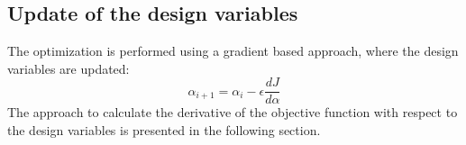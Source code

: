 \subsection{Update of the design variables}
The optimization is performed using a gradient based approach, where the design variables are updated:
\begin{equation}
\alpha_{i+1} = \alpha_i - \epsilon \frac{d J}{d \alpha}
\end{equation}
The approach to calculate the derivative of the objective function with respect to the design variables is presented in the following section.